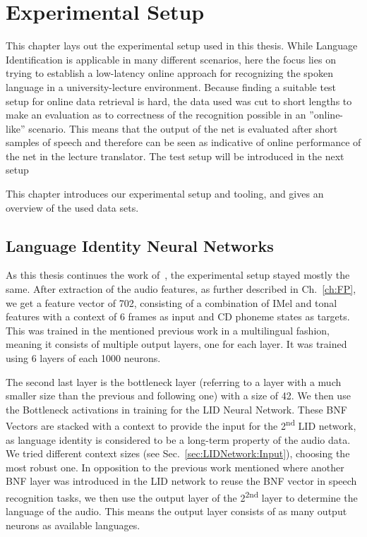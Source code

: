 




\chapter{Experimental Setup}
\label{ch:LITasks}

This chapter lays out the experimental setup used in this thesis. While Language Identification is applicable in many different scenarios, here the focus lies on trying to establish a low-latency online approach for recognizing the spoken language in a university-lecture environment. Because finding a suitable test setup for online data retrieval is hard, the data used was cut to short lengths to make an evaluation as to correctness of the recognition possible in an ''online-like'' scenario. 
This means that the output of the net is evaluated after short samples of speech and therefore can be seen as indicative of online performance of the net in the lecture translator. The test setup will be introduced in the next setup


This chapter introduces our experimental setup and tooling, and gives an overview of the used data sets.

\section{Language Identity Neural Networks}
\label{sec:LITasks:GS}

As this thesis continues the work of~\cite{Mueller2016b}, the experimental setup stayed mostly the same. After extraction of the audio features, as further described in Ch.~\ref{ch:FP}, we get a feature vector of 702, consisting of a combination of IMel and tonal features with a context of 6 frames as input and CD phoneme states as targets. This was trained in the mentioned previous work in a multilingual fashion, meaning it consists of multiple output layers, one for each layer. It was trained using 6 layers of each 1000 neurons.

The second last layer is the bottleneck layer (referring to a layer with a much smaller size than the previous and following one) with a size of 42. We then use the Bottleneck activations in training for the LID Neural Network. These BNF Vectors are stacked with a context to provide the input for the 2\textsuperscript{nd} LID network, as language identity is considered to be a long-term property of the audio data. We tried different context sizes (see Sec.~\ref{sec:LIDNetwork:Input}), choosing the most robust one.  In opposition to the previous work mentioned where another BNF layer was introduced in the LID network to reuse the BNF vector in speech recognition tasks, we then use the output layer of the 2\textsuperscript{2nd} layer to determine the language of the audio. This means the output layer consists of as many output neurons as available languages.

